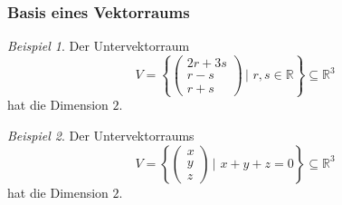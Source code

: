 \documentclass[hyperref={pdfpagelabels=false}]{beamer}
\theoremstyle{plain}%
\theoremstyle{definition}
\theoremstyle{remark}
\newtheorem*{beispiel}{Beispiel}
\def \R{\mathbb R}
\begin{document}
\begin{frame}
\frametitle{Basis eines Vektorraums}

\begin{beispiel}
Der Untervektorraum 
	$$ V = \left\{ \begin{pmatrix} 2r + 3s \\ r-s \\ r+s \end{pmatrix} \,\vert \,\,r, s \in \R \right\} \subseteq \R^3 $$
hat die Dimension $2$.
\end{beispiel}

\pause 

\begin{beispiel}
Der Untervektorraums 
	$$ V =  \left\{ \begin{pmatrix} x \\ y \\ z \end{pmatrix} \,\vert \,\, x + y + z = 0 \right\} \subseteq \R^3 $$
hat die Dimension $2$. 
\end{beispiel}

\end{frame}
\end{document}
